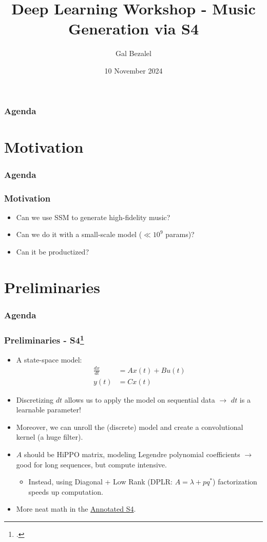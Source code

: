 \documentclass{beamer}
\title{Deep Learning Workshop - Music Generation via S4}
\author{Gal Bezalel}
\institute{Tel-Aviv University}
\date{10 November 2024}
\begin{document}
\frame{\titlepage}

\begin{frame}
    \frametitle{Agenda}
    \tableofcontents
\end{frame}



\section{Motivation}
\begin{frame}
    \frametitle{Agenda}
    \tableofcontents[currentsection]
\end{frame}
\begin{frame}
    \frametitle{Motivation}
    \begin{itemize}
    \item Can we use SSM to generate high-fidelity music?
    \item Can we do it with a small-scale model ($\ll 10^9$ params)?
    \item Can it be productized?
    \end{itemize}
\end{frame}

\section{Preliminaries}
\begin{frame}
    \frametitle{Agenda}
    \tableofcontents[currentsection]
\end{frame}
\begin{frame}
    \frametitle{Preliminaries - S4\footcite{gu2022efficientlymodelinglongsequences}}
    \begin{itemize}
        \item A state-space model: \begin{align*}
            \frac{dx}{dt} &= Ax(t) + Bu(t) \\
            y(t) &= Cx(t)
        \end{align*}
        \item Discretizing $dt$  allows us to apply the model on sequential data $\rightarrow$ $dt$ is a learnable parameter!
        \item Moreover, we can unroll the (discrete) model and create a convolutional kernel (a huge filter).
        \item $A$ should be HiPPO matrix, modeling Legendre polynomial coefficients $\rightarrow$ good for long sequences, but compute intensive.
        \begin{itemize}
            \item Instead, using Diagonal + Low Rank (DPLR: $A = \lambda + pq^\ast$) factorization speeds up computation.
        \end{itemize}
        \item More neat math in the \href{https://iclr-blog-track.github.io/2022/03/25/annotated-s4/}{Annotated S4}.
    \end{itemize}
\end{frame}
\end{document}
